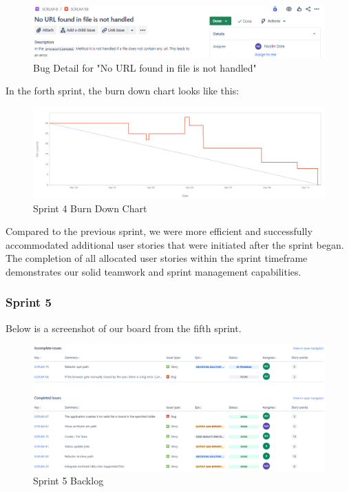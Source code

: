 \begin{figure}[h!]
    \centering
    \includegraphics[width=1\textwidth]{pictures/Scrum/Sprint 4/Bug_1}
    \caption{Bug Detail for "No URL found in file is not handled"}
    \label{fig:sprint_4_bug_1}
\end{figure}


In the forth sprint, the burn down chart looks like this:
\begin{figure}[h!]
    \centering
    \includegraphics[width=1\textwidth]{pictures/Scrum/Sprint 4/Sprint4_Burndownchart}
    \caption{Sprint 4 Burn Down Chart}
    \label{fig:sprint_4_bunrdown_chart}
\end{figure}

Compared to the previous sprint, we were more efficient and successfully accommodated additional user stories that were initiated after the sprint began.
The completion of all allocated user stories within the sprint timeframe demonstrates our solid teamwork and sprint management capabilities.
\clearpage


\subsubsection{Sprint 5}
Below is a screenshot of our board from the fifth sprint.
\begin{figure}[h!]
    \centering
    \includegraphics[width=1\textwidth]{pictures/Scrum/Sprint 5/Sprint5_Backlog}
    \caption{Sprint 5 Backlog}
    \label{fig:sprint_5_backlog}
\end{figure}

